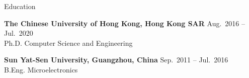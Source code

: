 

\begin{rSection}{Education}

{\bf The Chinese University of Hong Kong, Hong Kong SAR} \hfill { Aug.~2016 -- Jul.~2020}\\
Ph.D. \quad Computer Science and Engineering

{\bf Sun Yat-Sen University, Guangzhou, China} \hfill { Sep.~2011 -- Jul.~2016}\\
B.Eng. \quad Microelectronics
\end{rSection}

